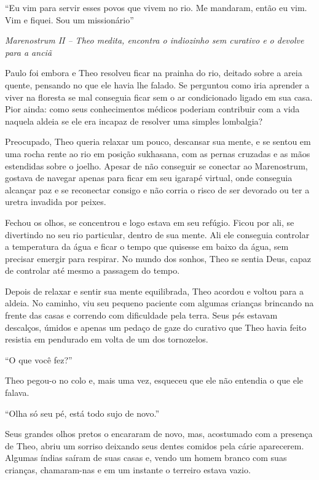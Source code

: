``Eu vim para servir esses povos que vivem no rio. Me mandaram, então eu
vim. Vim e fiquei. Sou um missionário''

\asterisc

\emph{Marenostrum II -- Theo medita, encontra o indiozinho sem curativo e o devolve para a anciã}

Paulo foi embora e Theo resolveu ficar na prainha do rio, deitado sobre
a areia quente, pensando no que ele havia lhe falado. Se perguntou como
iria aprender a viver na floresta se mal conseguia ficar sem o ar
condicionado ligado em sua casa. Pior ainda: como seus conhecimentos
médicos poderiam contribuir com a vida naquela aldeia se ele era incapaz
de resolver uma simples lombalgia?

Preocupado, Theo queria relaxar um pouco, descansar sua mente, e se
sentou em uma rocha rente ao rio em posição sukhasana, com as pernas
cruzadas e as mãos estendidas sobre o joelho. Apesar de não conseguir se
conectar ao Marenostrum, gostava de navegar apenas para ficar em seu
igarapé virtual, onde conseguia alcançar paz e se reconectar consigo e
não corria o risco de ser devorado ou ter a uretra invadida por peixes.

Fechou os olhos, se concentrou e logo estava em seu refúgio. Ficou por
ali, se divertindo no seu rio particular, dentro de sua mente. Ali ele
conseguia controlar a temperatura da água e ficar o tempo que quisesse
em baixo da água, sem precisar emergir para respirar. No mundo dos
sonhos, Theo se sentia Deus, capaz de controlar até mesmo a passagem do
tempo.

Depois de relaxar e sentir sua mente equilibrada, Theo acordou e voltou
para a aldeia. No caminho, viu seu pequeno paciente com algumas crianças
brincando na frente das casas e correndo com dificuldade pela terra.
Seus pés estavam descalços, úmidos e apenas um pedaço de gaze do
curativo que Theo havia feito resistia em pendurado em volta de um dos
tornozelos.

``O que você fez?''

Theo pegou-o no colo e, mais uma vez, esqueceu que ele não entendia o
que ele falava.

``Olha só seu pé, está todo sujo de novo.''

Seus grandes olhos pretos o encararam de novo, mas, acostumado com a
presença de Theo, abriu um sorriso deixando seus dentes comidos pela
cárie aparecerem. Algumas índias saíram de suas casas e, vendo um homem
branco com suas crianças, chamaram-nas e em um instante o terreiro
estava vazio.


